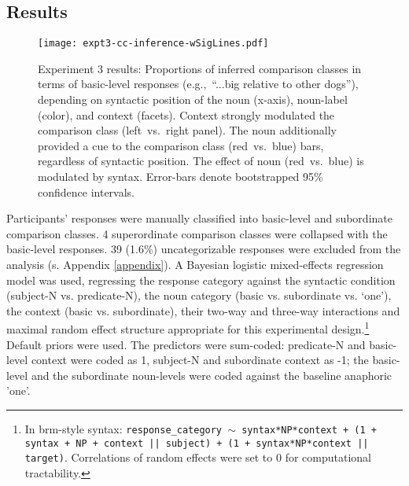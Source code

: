 \subsection{Results}
\label{cci-results-text}
\begin{figure*}[t]
	\begin{center}
		\texttt{[image: expt3-cc-inference-wSigLines.pdf]}
	\end{center}
	\vspace{-0.3cm}
	\caption{Experiment 3 results: Proportions of inferred comparison classes in terms of basic-level responses (e.g.,~“...big relative to other dogs”), depending on syntactic position of the noun (x-axis), noun-label (color), and context (facets).
		Context strongly modulated the comparison class (left~vs.~right panel). 
		The noun additionally provided a cue to the comparison class (red~vs.~blue) bars, regardless of syntactic position. 
		The effect of noun (red~vs.~blue) is modulated by syntax. 
		Error-bars denote bootstrapped 95\% confidence intervals.}
	\label{cci-results}
\end{figure*}
Participants’ responses were manually classified into basic-level and subordinate comparison classes. 4 superordinate comparison classes were collapsed with the basic-level responses. 39 (1.6\%) uncategorizable responses were excluded from the analysis (s. Appendix \ref{appendix}). 
A Bayesian logistic mixed-effects regression model was used, regressing the response category against the syntactic condition (subject-N vs. predicate-N), the noun category (basic vs. subordinate vs. ‘one’), the context (basic vs. subordinate), their two-way and three-way interactions and maximal random effect structure appropriate for this experimental design.\footnote{In brm-style syntax: \texttt{response\_category $\sim$ syntax*NP*context + (1 + syntax + NP + context || subject) + (1 + syntax*NP*context || target)}. Correlations of random effects were set to 0 for computational tractability.} Default priors were used.
The predictors were sum-coded: predicate-N and basic-level context were coded as 1, subject-N and subordinate context as -1; the basic-level and the subordinate noun-levels were coded against the baseline anaphoric 'one'. 

